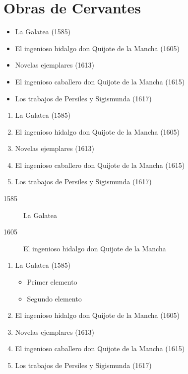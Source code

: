 \documentclass[a4paper,12pt]{article} %
\begin{document}

\section{Obras de Cervantes}
\begin{itemize}
    
\item La Galatea (1585)
\item El ingenioso hidalgo don Quijote de la Mancha (1605)
\item Novelas ejemplares (1613)
\item El ingenioso caballero don Quijote de la Mancha (1615)
\item Los trabajos de Persiles y Sigismunda (1617)

\end{itemize}

\begin{enumerate}
    \item La Galatea (1585)
    \item El ingenioso hidalgo don Quijote de la Mancha (1605)
    \item Novelas ejemplares (1613)
    \item El ingenioso caballero don Quijote de la Mancha (1615)
    \item Los trabajos de Persiles y Sigismunda (1617)
\end{enumerate}


\begin{description}

\item[1585] La Galatea
\item[1605] El ingenioso hidalgo don Quijote de la Mancha

\end{description}


    \begin{enumerate}
    \item La Galatea (1585)
        \begin{itemize}
            \item Primer elemento
            \item Segundo elemento
        \end{itemize}
    \item El ingenioso hidalgo don Quijote de la Mancha (1605)
    \item Novelas ejemplares (1613)
    \item El ingenioso caballero don Quijote de la Mancha (1615)
    \item Los trabajos de Persiles y Sigismunda (1617)
\end{enumerate}
\end{document}
